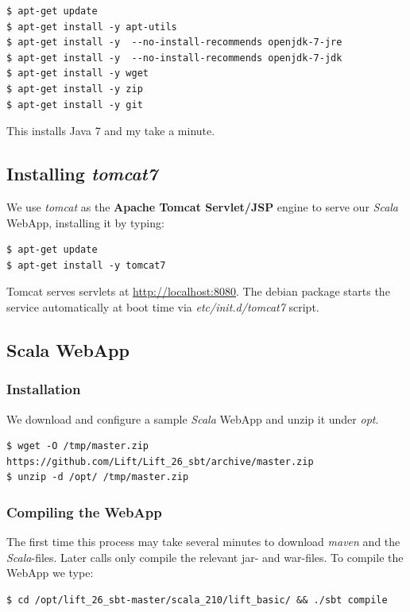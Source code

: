\documentclass[captions=tableheading]{article}
\begin{document}
\begin{verbatim}
$ apt-get update
$ apt-get install -y apt-utils
$ apt-get install -y  --no-install-recommends openjdk-7-jre
$ apt-get install -y  --no-install-recommends openjdk-7-jdk
$ apt-get install -y wget
$ apt-get install -y zip
$ apt-get install -y git
\end{verbatim}
This installs Java 7 and my take a minute.
\subsection{Installing \emph{tomcat7}}
\label{sec-4-2}

We use \emph{tomcat} as the \textbf{Apache Tomcat Servlet/JSP} engine to serve our \emph{Scala} WebApp, installing it by typing:

\begin{verbatim}
$ apt-get update
$ apt-get install -y tomcat7
\end{verbatim}
Tomcat serves servlets  at \href{http://localhost:8080}{http://localhost:8080}. The debian package starts the service automatically at boot time via \emph{etc/init.d/tomcat7} script.
\subsection{Scala WebApp}
\label{sec-4-3}
\subsubsection{Installation}
\label{sec-4-3-1}

We download and configure a sample \emph{Scala} WebApp and unzip it under \emph{opt}.

\begin{verbatim}
$ wget -O /tmp/master.zip https://github.com/Lift/Lift_26_sbt/archive/master.zip
$ unzip -d /opt/ /tmp/master.zip
\end{verbatim}
\subsubsection{Compiling the WebApp}
\label{sec-4-3-2}

The first time this process may take several minutes to download \emph{maven} and the \emph{Scala}-files. Later calls only compile the relevant jar- and war-files. To compile the WebApp we type:

\begin{verbatim}
$ cd /opt/lift_26_sbt-master/scala_210/lift_basic/ && ./sbt compile
\end{verbatim}
\end{document}
